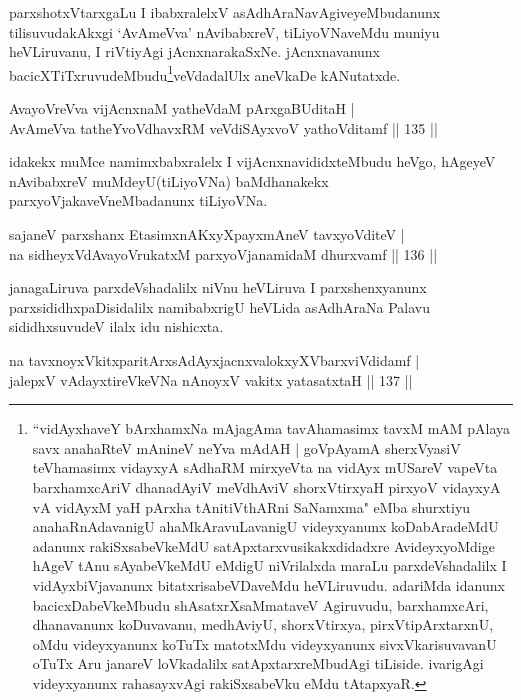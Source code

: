 \begin{artha}
parxshotxVtarxgaLu I ibabxralelxV asAdhAraNavAgiveyeMbudanunx tilisuvudakAkxgi `AvAmeVva' nAvibabxreV, tiLiyoVNaveMdu muniyu heVLiruvanu, I riVtiyAgi jAcnxnarakaSxNe. jAcnxnavanunx bacicXTiTxruvudeMbudu\footnote{``vidAyxhaveY bArxhamxNa mAjagAma tavAhamasimx tavxM mAM pAlaya savx anahaRteV mAnineV neYva mAdAH | goVpAyamA sherxVyasiV teVhamasimx vidayxyA sAdhaRM mirxyeVta na vidAyx mUSareV vapeVta barxhamxcAriV dhanadAyiV meVdhAviV shorxVtirxyaH pirxyoV vidayxyA vA vidAyxM yaH pArxha tAnitiVthARni SaNamxma" eMba shurxtiyu anahaRnAdavanigU ahaMkAravuLavanigU videyxyanunx koDabAradeMdU adanunx rakiSxsabeVkeMdU satApxtarxvusikakxdidadxre AvideyxyoMdige hAgeV tAnu sAyabeVkeMdU eMdigU niVrilalxda maraLu parxdeVshadalilx I vidAyxbiVjavanunx bitatxrisabeVDaveMdu heVLiruvudu. adariMda idanunx bacicxDabeVkeMbudu shAsatxrXsaMmataveV Agiruvudu, barxhamxcAri, dhanavanunx koDuvavanu, medhAviyU, shorxVtirxya, pirxVtipArxtarxnU, oMdu videyxyanunx koTuTx matotxMdu videyxyanunx sivxVkarisuvavanU oTuTx Aru janareV loVkadalilx satApxtarxreMbudAgi tiLiside. ivarigAgi videyxyanunx rahasayxvAgi rakiSxsabeVku eMdu tAtapxyaR.}veVdadalUlx aneVkaDe kANutatxde.
\end{artha}

\begin{shl}
AvayoVreVva vijAcnxnaM yatheVdaM pArxgaBUditaH |\\
AvAmeVva tatheYvoVdhavxRM veVdiSAyxvoV yathoVditamf \hfill || 135 ||
\end{shl}

\begin{artha}
idakekx muMce namimxbabxralelx I vijAcnxnavididxteMbudu heVgo, hAgeyeV nAvibabxreV muMdeyU(tiLiyoVNa) baMdhanakekx parxyoVjakaveVneMbadanunx tiLiyoVNa.
\end{artha}

\begin{shl}
sajaneV parxshanx EtasimxnAKxyXpayxmAneV tavxyoVditeV |\\
na sidheyxVdAvayoVrukatxM parxyoVjanamidaM dhurxvamf \hfill || 136 ||
\end{shl}

\begin{artha}
janagaLiruva parxdeVshadalilx niVnu heVLiruva I parxshenxyanunx parxsididhxpaDisidalilx namibabxrigU heVLida asAdhAraNa Palavu sididhxsuvudeV ilalx idu nishicxta.
\end{artha}

\begin{shl}
na tavxnoyxVkitxparitArxsAdAyxjacnxvalokxyXV\s barxviVdidamf |\\
jalepxV vAdayxtireVkeVNa nAnoyxV vakitx yatasatxtaH \hfill || 137 ||
\end{shl}

